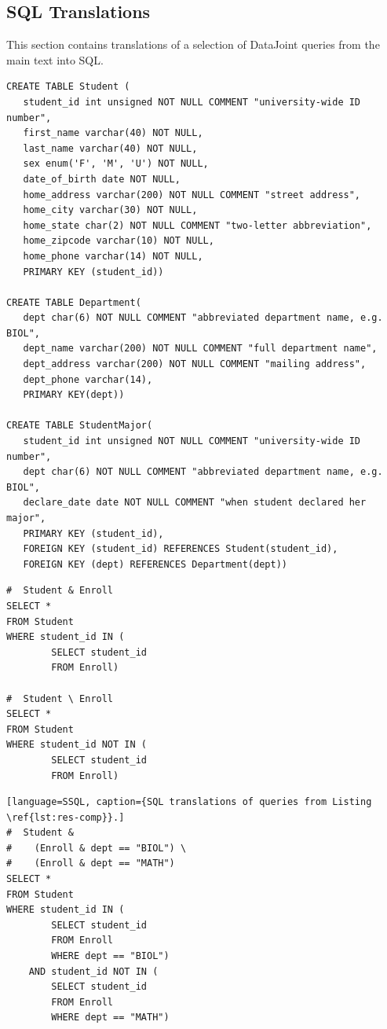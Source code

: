 \documentclass[letter,10pt]{article}
\newcommand{\datajoint}{DataJoint\xspace}
\begin{document}
\begin{appendices}

\section{SQL Translations}
This section contains translations of a selection of \datajoint queries from the main text into SQL. 

\begin{lstlisting}[language=SSQL, caption={SQL translations of queries from Listing \ref{lst:uni1}}]
CREATE TABLE Student (
   student_id int unsigned NOT NULL COMMENT "university-wide ID number",
   first_name varchar(40) NOT NULL,
   last_name varchar(40) NOT NULL,
   sex enum('F', 'M', 'U') NOT NULL, 
   date_of_birth date NOT NULL,
   home_address varchar(200) NOT NULL COMMENT "street address",
   home_city varchar(30) NOT NULL,
   home_state char(2) NOT NULL COMMENT "two-letter abbreviation",
   home_zipcode varchar(10) NOT NULL,
   home_phone varchar(14) NOT NULL, 
   PRIMARY KEY (student_id))

CREATE TABLE Department(
   dept char(6) NOT NULL COMMENT "abbreviated department name, e.g. BIOL",
   dept_name varchar(200) NOT NULL COMMENT "full department name",
   dept_address varchar(200) NOT NULL COMMENT "mailing address",
   dept_phone varchar(14),
   PRIMARY KEY(dept))

CREATE TABLE StudentMajor(
   student_id int unsigned NOT NULL COMMENT "university-wide ID number",
   dept char(6) NOT NULL COMMENT "abbreviated department name, e.g. BIOL",
   declare_date date NOT NULL COMMENT "when student declared her major",
   PRIMARY KEY (student_id),
   FOREIGN KEY (student_id) REFERENCES Student(student_id),
   FOREIGN KEY (dept) REFERENCES Department(dept))
\end{lstlisting}

\begin{lstlisting}[language=SSQL, caption={SQL translations of queries from Listing \ref{lst:res-set}}]
#  Student & Enroll
SELECT * 
FROM Student 
WHERE student_id IN (
        SELECT student_id 
        FROM Enroll)

#  Student \ Enroll
SELECT * 
FROM Student 
WHERE student_id NOT IN (
        SELECT student_id 
        FROM Enroll)
\end{lstlisting}

\begin{lstlisting}[language=SSQL, caption={SQL translations of queries from Listing \ref{lst:res-comp}}.]
#  Student &
#    (Enroll & dept == "BIOL") \
#    (Enroll & dept == "MATH")
SELECT * 
FROM Student 
WHERE student_id IN (
        SELECT student_id 
        FROM Enroll
        WHERE dept == "BIOL")
    AND student_id NOT IN (
        SELECT student_id
        FROM Enroll
        WHERE dept == "MATH")


\end{lstlisting}
\end{appendices}
\end{document}
